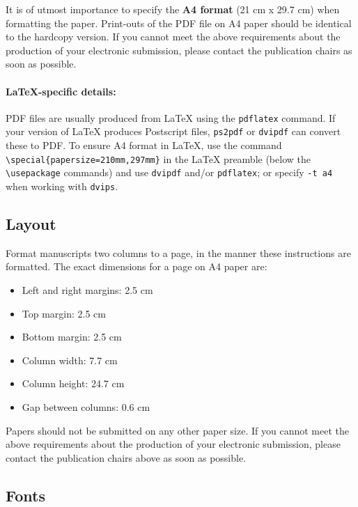 \documentclass[11pt,a4paper]{article}
\begin{document}
It is of utmost importance to specify the \textbf{A4 format} (21 cm x 29.7 cm) when formatting the paper.
Print-outs of the PDF file on A4 paper should be identical to the hardcopy version.
If you cannot meet the above requirements about the production of your electronic submission, please contact the publication chairs as soon as possible.

\paragraph{\LaTeX-specific details:}
PDF files are usually produced from \LaTeX{} using the \texttt{\small pdflatex} command.
If your version of \LaTeX{} produces Postscript files, \texttt{\small ps2pdf} or \texttt{\small dvipdf} can convert these to PDF.
To ensure A4 format in \LaTeX, use the command {\small\verb|\special{papersize=210mm,297mm}|}
in the \LaTeX{} preamble (below the {\small\verb|\usepackage|} commands) and use \texttt{\small dvipdf} and/or \texttt{\small pdflatex}; or specify \texttt{\small -t a4} when working with \texttt{\small dvips}.

\subsection{Layout}
\label{ssec:layout}

Format manuscripts two columns to a page, in the manner these
instructions are formatted.
The exact dimensions for a page on A4 paper are:

\begin{itemize}
\item Left and right margins: 2.5 cm
\item Top margin: 2.5 cm
\item Bottom margin: 2.5 cm
\item Column width: 7.7 cm
\item Column height: 24.7 cm
\item Gap between columns: 0.6 cm
\end{itemize}

\noindent Papers should not be submitted on any other paper size.
If you cannot meet the above requirements about the production of your electronic submission, please contact the publication chairs above as soon as possible.

\subsection{Fonts}
\end{document}
